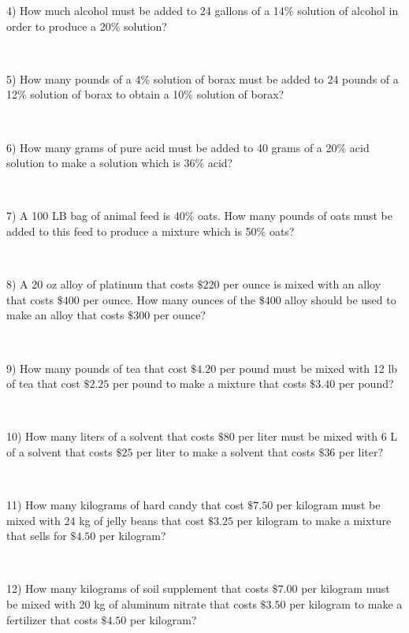 4) How much alcohol must be added to 24 gallons of a 14\% solution of alcohol
in order to produce a 20\% solution?\par
~\par

5) How many pounds of a 4\% solution of borax must be added to 24 pounds of a 12\% solution of borax to obtain a 10\% solution of borax?\par
~\par

6) How many grams of pure acid must be added to 40 grams of a 20\% acid solution to make a solution which is 36\% acid?\par
~\par

7) A 100 LB bag of animal feed is 40\% oats. How many pounds of oats must be added to this feed to produce a mixture which is 50\% oats?\par
~\par

8) A 20 oz alloy of platinum that costs $\$220$ per ounce is mixed
with an alloy that costs $\$400$ per ounce. How many ounces of the $\$400$ alloy should be used to make an
alloy that costs $\$300$ per ounce?\par
~\par

9) How many pounds of tea that cost $\$4.20$ per pound must be mixed
with 12 lb of tea that cost $\$2.25$ per pound to make a
mixture that costs $\$3.40$ per pound?\par
~\par

10) How many liters of a solvent that costs $\$80$ per liter must be
mixed with 6 L of a solvent that costs $\$25$ per liter
to make a solvent that costs $\$36$ per liter?\par
~\par

11) How many kilograms of hard candy that cost $\$7.50$ per kilogram
must be mixed with 24 kg of jelly beans that cost
$\$3.25$ per kilogram to make a mixture
that sells for $\$4.50$ per kilogram?\par
~\par

12) How many kilograms of soil supplement that costs $\$7.00$ per
kilogram must be mixed with 20 kg of aluminum nitrate that
costs $\$3.50$ per kilogram to make a fertilizer
that costs $\$4.50$ per kilogram?\par
~\par

